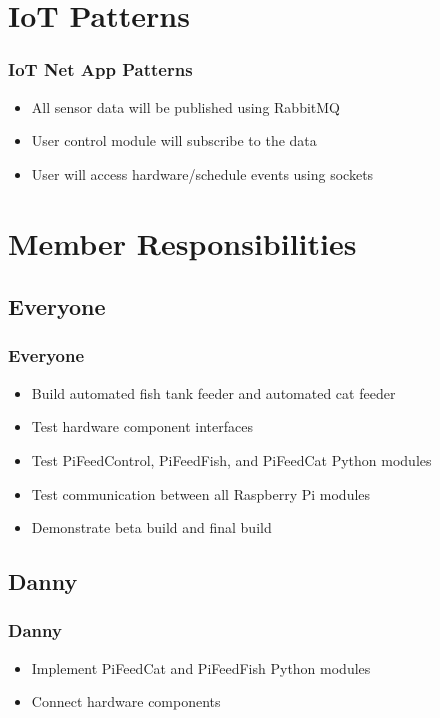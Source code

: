 \documentclass[]{beamer}
\begin{document}
\section{IoT Patterns}
\begin{frame}
	\frametitle{IoT Net App Patterns}
	\begin{itemize}
    \item All sensor data will be published using RabbitMQ
    \item User control module will subscribe to the data
    \item User will access hardware/schedule events using sockets
    \end{itemize}
\end{frame}




\section{Member Responsibilities}
\subsection{Everyone}
\begin{frame}
	\frametitle{Everyone}
	\begin{itemize}
    	\item Build automated fish tank feeder and automated cat feeder
        \item Test hardware component interfaces
        \item Test PiFeedControl, PiFeedFish, and PiFeedCat Python modules
        \item Test communication between all Raspberry Pi modules
        \item Demonstrate beta build and final build
    \end{itemize}
\end{frame}

\subsection{Danny}
\begin{frame}
	\frametitle{Danny}
	\begin{itemize}
    	\item Implement PiFeedCat and PiFeedFish Python modules
        \item Connect hardware components
    \end{itemize}
\end{frame}
\end{document}
